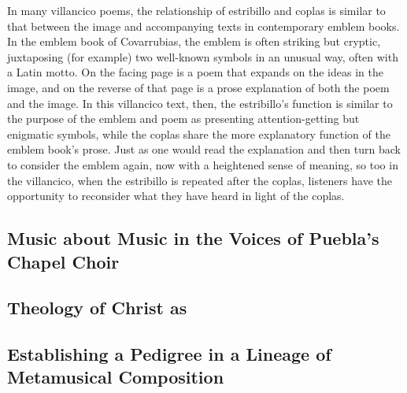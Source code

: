 
In many villancico poems, the relationship of estribillo and coplas is similar
to that between the image and accompanying texts in contemporary emblem books.%
    \Autocite{Covarrubias:Emblemas}
In the emblem book of Covarrubias, the emblem is often striking but cryptic,
juxtaposing (for example) two well-known symbols in an unusual way, often with a
Latin motto.
On the facing page is a poem that expands on the ideas in the image, and on the
reverse of that page is a prose explanation of both the poem and the image.
In this villancico text, then, the estribillo's function is similar to the
purpose of the emblem and poem as presenting attention-getting but enigmatic
symbols, while the coplas share the more explanatory function of the emblem
book's prose. 
Just as one would read the explanation and then turn back to consider the emblem
again, now with a heightened sense of meaning, so too in the villancico, when
the estribillo is repeated after the coplas, listeners have the opportunity to
reconsider what they have heard in light of the coplas. 







\subsection{Music about Music in the Voices of Puebla's Chapel Choir}

\subsection{Theology of Christ as }

\subsection{Establishing a Pedigree in a Lineage of Metamusical Composition}

